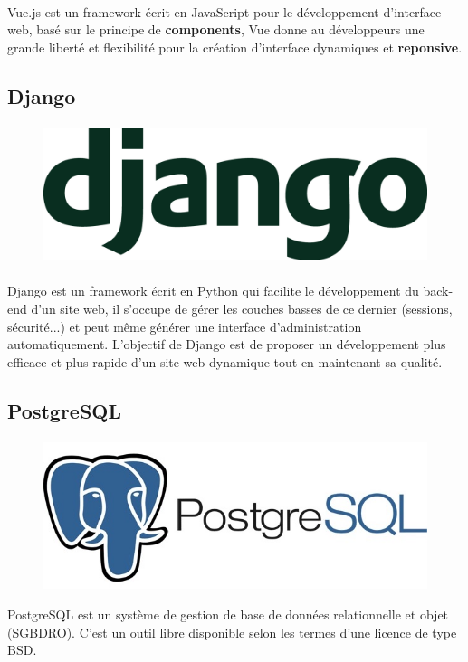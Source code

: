 \documentclass[]{report}
\begin{document}
			\paragraph{}
			Vue.js est un framework écrit en JavaScript pour le développement d'interface web, basé sur le principe de \textbf{components}, Vue donne au développeurs une grande liberté et flexibilité pour la création d'interface dynamiques
			et \textbf{reponsive}.
			
		\subsection{Django}
			\paragraph{}
			\begin{figure}[H]
				\centering
				\includegraphics[width=0.35\linewidth]{images/django.png}
			\end{figure}
			\paragraph{}
			Django est un framework écrit en Python qui facilite le développement du back-end d'un site web, il s'occupe de gérer les couches basses de ce dernier (sessions, sécurité...)   et peut même générer une interface d'administration automatiquement. L’objectif  de Django est de proposer un développement plus efficace et plus rapide d'un site web dynamique tout en maintenant sa qualité.
		\subsection{PostgreSQL}
			\paragraph{}
			\begin{figure}[H]
				\centering
				\includegraphics[width=0.35\linewidth]{images/postgresql.jpg}
			\end{figure}
			PostgreSQL est un système de gestion de base de données relationnelle et objet (SGBDRO). C'est un outil libre disponible selon les termes d'une licence de type BSD.
		\newpage
\end{document}
